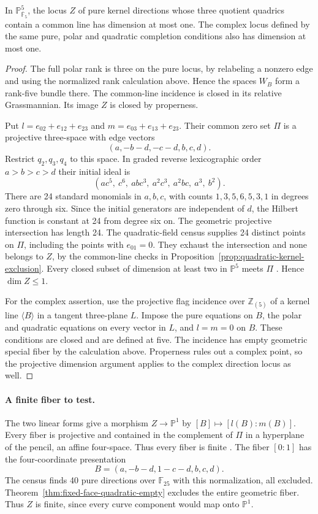 \begin{proposition}
\label{prop:kernel-curve}
In \(\mathbb P^5_{\overline{\mathbb F}_5}\), the locus \(Z\) of pure
kernel directions whose three quotient quadrics contain a common line
has dimension at most one. The complex locus defined by the same
pure, polar and quadratic completion conditions also has dimension
at most one.
\end{proposition}
\begin{proof}
The full polar rank is three on the pure locus, by relabeling a nonzero
edge and using the normalized rank calculation above. Hence the spaces
\(W_B\) form a rank-five bundle there. The common-line incidence is
closed in its relative Grassmannian. Its image \(Z\) is closed by
properness.

Put \(l=e_{02}+e_{12}+e_{23}\) and \(m=e_{03}+e_{13}+e_{23}\). Their
common zero set \(\Pi\) is a projective three-space with edge vectors
\[
                 (a,-b-d,-c-d,b,c,d).
\]
Restrict \(q_2,q_3,q_4\) to this space. In graded reverse lexicographic
order \(a>b>c>d\) their initial ideal is
\[
       (ac^5,\ c^6,\ abc^3,\ a^2c^3,\ a^2bc,\ a^3,\ b^2).
\]
There are 24 standard monomials in \(a,b,c\), with counts
\(1,3,5,6,5,3,1\) in degrees zero through six. Since the initial
generators are independent of \(d\), the Hilbert function is constant
at 24 from degree six on. The geometric projective intersection has
length 24. The quadratic-field census supplies 24 distinct points on
\(\Pi\), including the points with \(e_{01}=0\). They exhaust the
intersection and none belongs to \(Z\), by the common-line checks in
Proposition~\ref{prop:quadratic-kernel-exclusion}. Every closed subset
of dimension at least two in \(\mathbb P^5\) meets \(\Pi\)
\cite{stacksProjectiveIntersection}. Hence \(\dim Z\le1\).

For the complex assertion, use the projective flag incidence over
\(\mathbb Z_{(5)}\) of a kernel line \(\langle B\rangle\) in a
tangent three-plane \(L\). Impose the pure equations on \(B\), the
polar and quadratic equations on every vector in \(L\), and \(l=m=0\)
on \(B\). These conditions are closed and are defined at five.
The incidence has empty geometric special fiber by the calculation
above. Properness rules out a complex point, so the projective
dimension argument applies to the complex direction locus as well.
\end{proof}

\paragraph{A finite fiber to test.}
The two linear forms give a morphism \(Z\to\mathbb P^1\) by
\([B]\mapsto[l(B):m(B)]\). Every fiber is projective and contained
in the complement of \(\Pi\) in a hyperplane of the pencil, an affine
four-space. Thus every fiber is finite \cite{stacksproperaffine}.
The fiber \([0:1]\) has the four-coordinate presentation
\[
                 B=(a,-b-d,1-c-d,b,c,d).
\]
The census finds 40 pure directions over \(\mathbb F_{25}\) with this
normalization, all excluded. Theorem~\ref{thm:fixed-face-quadratic-empty}
excludes the entire geometric fiber. Thus \(Z\) is finite, since every
curve component would map onto \(\mathbb P^1\).

